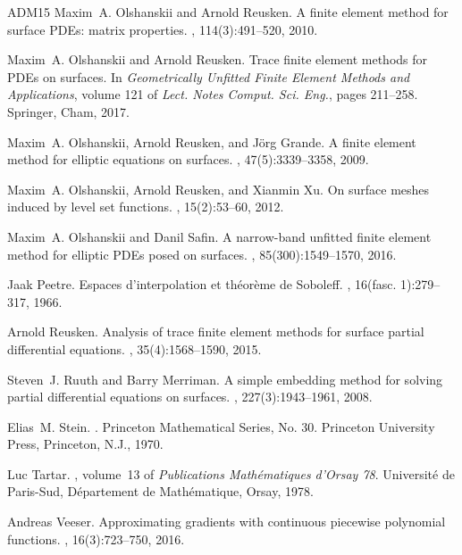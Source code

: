 \documentclass{amsart}
\begin{document}
\begin{thebibliography}{ADM{\etalchar{+}}15}
Maxim~A. Olshanskii and Arnold Reusken.
\newblock A finite element method for surface {PDE}s: matrix properties.
, 114(3):491--520, 2010.

Maxim~A. Olshanskii and Arnold Reusken.
\newblock Trace finite element methods for {PDE}s on surfaces.
\newblock In {\em Geometrically Unfitted Finite Element Methods and
  Applications}, volume 121 of {\em Lect. Notes Comput. Sci. Eng.}, pages
  211--258. Springer, Cham, 2017.

Maxim~A. Olshanskii, Arnold Reusken, and J\"{o}rg Grande.
\newblock A finite element method for elliptic equations on surfaces.
, 47(5):3339--3358, 2009.

Maxim~A. Olshanskii, Arnold Reusken, and Xianmin Xu.
\newblock On surface meshes induced by level set functions.
, 15(2):53--60, 2012.

Maxim~A. Olshanskii and Danil Safin.
\newblock A narrow-band unfitted finite element method for elliptic {PDE}s
  posed on surfaces.
, 85(300):1549--1570, 2016.

Jaak Peetre.
\newblock Espaces d'interpolation et th\'{e}or\`eme de {S}oboleff.
, 16(fasc. 1):279--317, 1966.

Arnold Reusken.
\newblock Analysis of trace finite element methods for surface partial
  differential equations.
, 35(4):1568--1590, 2015.

Steven~J. Ruuth and Barry Merriman.
\newblock A simple embedding method for solving partial differential equations
  on surfaces.
, 227(3):1943--1961, 2008.

Elias~M. Stein.
.
\newblock Princeton Mathematical Series, No. 30. Princeton University Press,
  Princeton, N.J., 1970.

Luc Tartar.
, volume~13 of {\em Publications
  Math\'{e}matiques d'Orsay 78}.
\newblock Universit\'{e} de Paris-Sud, D\'{e}partement de Math\'{e}matique,
  Orsay, 1978.

Andreas Veeser.
\newblock Approximating gradients with continuous piecewise polynomial
  functions.
, 16(3):723--750, 2016.


\end{thebibliography}
\end{document}
